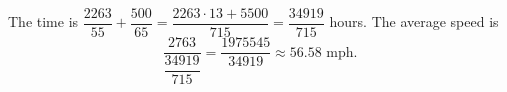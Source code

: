 The time is $\dfrac{2263}{55}+\dfrac{500}{65}=\dfrac{2263\cdot13+5500}{715}=\dfrac{34919}{715}$ hours. The average speed is
\[\dfrac{2763}{\dfrac{34919}{715}}=\boxed{\dfrac{1975545}{34919}}\approx56.58\text{ mph}.\]
